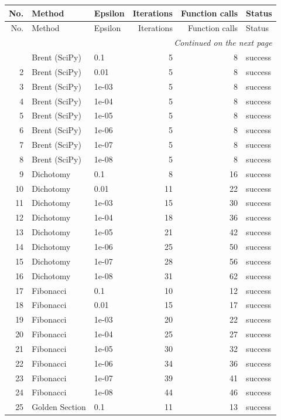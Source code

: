 \begin{longtable}{rllrrl}
\toprule
No. & Method & Epsilon & Iterations & Function calls & Status \\
\midrule
\endfirsthead
\toprule
No. & Method & Epsilon & Iterations & Function calls & Status \\
\midrule
\endhead
\midrule
\multicolumn{6}{r}{\textit{Continued on the next page}} \\
\midrule
\endfoot
\bottomrule
\endlastfoot
1 & Brent (SciPy) & 0.1 & 5 & 8 & success \\
2 & Brent (SciPy) & 0.01 & 5 & 8 & success \\
3 & Brent (SciPy) & 1e-03 & 5 & 8 & success \\
4 & Brent (SciPy) & 1e-04 & 5 & 8 & success \\
5 & Brent (SciPy) & 1e-05 & 5 & 8 & success \\
6 & Brent (SciPy) & 1e-06 & 5 & 8 & success \\
7 & Brent (SciPy) & 1e-07 & 5 & 8 & success \\
8 & Brent (SciPy) & 1e-08 & 5 & 8 & success \\
9 & Dichotomy & 0.1 & 8 & 16 & success \\
10 & Dichotomy & 0.01 & 11 & 22 & success \\
11 & Dichotomy & 1e-03 & 15 & 30 & success \\
12 & Dichotomy & 1e-04 & 18 & 36 & success \\
13 & Dichotomy & 1e-05 & 21 & 42 & success \\
14 & Dichotomy & 1e-06 & 25 & 50 & success \\
15 & Dichotomy & 1e-07 & 28 & 56 & success \\
16 & Dichotomy & 1e-08 & 31 & 62 & success \\
17 & Fibonacci & 0.1 & 10 & 12 & success \\
18 & Fibonacci & 0.01 & 15 & 17 & success \\
19 & Fibonacci & 1e-03 & 20 & 22 & success \\
20 & Fibonacci & 1e-04 & 25 & 27 & success \\
21 & Fibonacci & 1e-05 & 30 & 32 & success \\
22 & Fibonacci & 1e-06 & 34 & 36 & success \\
23 & Fibonacci & 1e-07 & 39 & 41 & success \\
24 & Fibonacci & 1e-08 & 44 & 46 & success \\
25 & Golden Section & 0.1 & 11 & 13 & success \\

\end{longtable}
